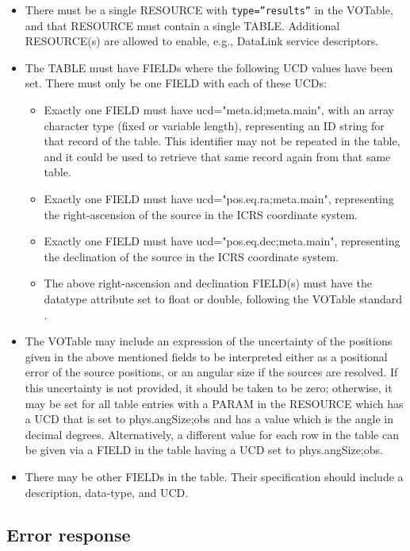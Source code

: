 \documentclass[11pt,a4paper]{ivoa}
\begin{document}
\begin{itemize}
	\item There must be a single RESOURCE with \texttt{type=''results''} in the VOTable,
		and that RESOURCE must contain a single TABLE. Additional RESOURCE(s) are
		allowed to enable, e.g., DataLink service descriptors.
	\item The TABLE must have FIELDs where
		the following UCD values have been set. There must only be one FIELD
		with each of these UCDs:

	\begin{itemize}
		\item Exactly one FIELD must have ucd="meta.id;meta.main",
	 		with an array character type (fixed or variable
			length), representing an ID string for that record of the table. This
			identifier may not be repeated in the table, and it could be used to
			retrieve that same record again from that same table.
		\item Exactly one FIELD must have ucd="pos.eq.ra;meta.main",
			representing the right-ascension of the source in the ICRS coordinate system.
		\item Exactly one FIELD must have ucd="pos.eq.dec;meta.main",
			representing the declination of the source in the ICRS coordinate system.
		\item The above right-ascension and declination FIELD(s) must have the datatype
			attribute set to float or double, following the VOTable
			standard \citep{2025ivoa.spec.0116O}.
	\end{itemize}

	\item The VOTable may include an expression of the
		uncertainty of the positions given in the above mentioned fields to be
		interpreted either as a positional error of the source positions, or an
		angular size if the sources are resolved. If this uncertainty is not
		provided, it should be taken to be zero; otherwise, it may be set for
		all table entries with a PARAM in the RESOURCE which has a UCD that is
		set to phys.angSize;obs and has a value which is the angle in decimal
		degrees. Alternatively, a different value for each row in the table can
		be given via a FIELD in the table having a UCD set to phys.angSize;obs.
	\item There may be other FIELDs in the table. Their specification should
		include a description, data-type, and UCD.
\end{itemize}
	
\subsection{Error response}
\label{subsec:error}
\end{document}
